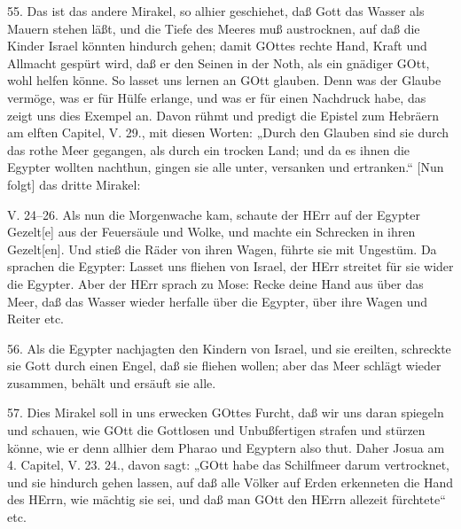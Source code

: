 55. Das ist das andere Mirakel, so alhier geschiehet, daß Gott das Wasser als Mauern stehen läßt, und die Tiefe des Meeres muß austrocknen, auf daß die Kinder Israel könnten hindurch gehen; damit GOttes rechte Hand, Kraft und Allmacht gespürt wird, daß er den Seinen in der Noth, als ein gnädiger GOtt, wohl helfen könne. So lasset uns lernen an GOtt glauben. Denn was der Glaube vermöge, was er für Hülfe erlange, und was er für einen Nachdruck habe, das zeigt uns dies Exempel an. Davon rühmt und predigt die Epistel zum Hebräern am elften Capitel, V. 29., mit diesen Worten: „Durch den Glauben sind sie durch das rothe Meer gegangen, als durch ein trocken Land; und da es ihnen die Egypter wollten nachthun, gingen sie alle unter, versanken und ertranken.“ [Nun folgt] das dritte Mirakel:

\begin{schriftzitat}
V. 24–26. Als nun die Morgenwache kam, schaute der HErr auf der Egypter Gezelt[e] aus der Feuersäule und Wolke, und machte ein Schrecken in ihren Gezelt[en]. Und stieß die Räder von ihren Wagen, führte sie mit Ungestüm. Da sprachen die Egypter: Lasset uns fliehen von Israel, der HErr streitet für sie wider die Egypter. Aber der HErr sprach zu Mose: Recke deine Hand aus über das Meer, daß das Wasser wieder herfalle über die Egypter, über ihre Wagen und Reiter etc.
\end{schriftzitat}

56. Als die Egypter nachjagten den Kindern von Israel, und sie ereilten, schreckte sie Gott durch einen Engel, daß sie fliehen wollen; aber das Meer schlägt wieder zusammen, behält und ersäuft sie alle.

57. Dies Mirakel soll in uns erwecken GOttes Furcht, daß wir uns daran spiegeln und schauen, wie GOtt die Gottlosen und Unbußfertigen strafen und stürzen könne, wie er denn allhier dem Pharao und Egyptern also thut. Daher Josua am 4. Capitel, V. 23. 24., davon sagt: „GOtt habe das Schilfmeer darum vertrocknet, und sie hindurch gehen lassen, auf daß alle Völker auf Erden erkenneten die Hand des HErrn, wie mächtig sie sei, und daß man GOtt den HErrn allezeit fürchtete“ etc.

